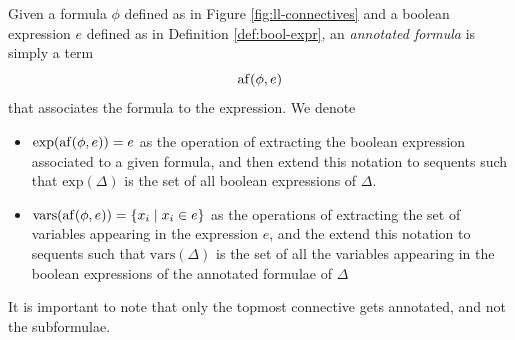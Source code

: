 \documentclass[a4paper, 12pt, english]{report}
\begin{document}
\begin{define}
	\label{def:annotated}
	Given a formula $\phi$ defined as in Figure \ref{fig:ll-connectives} and a boolean expression $e$ defined as in Definition \ref{def:bool-expr}, an \textit{annotated formula} is simply a term 
	$$ \mathrm{af}(\phi, e) $$
	that associates the formula to the expression.
	We denote 
	\begin{itemize}
		\item $ \text{exp}(\mathrm{af}(\phi, e)) = e $
			as the operation of extracting the boolean expression associated to a given formula, and then extend this notation to sequents such that $ \text{exp}(\Delta) $ is the set of all boolean expressions of $\Delta$.
		\item $\text{vars}(\mathrm{af}(\phi, e)) = \{ x_i \mid x_i \in e \} $
			as the operations of extracting the set of variables appearing in the expression $e$, and the extend this notation to sequents such that $ \text{vars}(\Delta)$ is the set of all the variables appearing in the boolean expressions of the annotated formulae of $\Delta$
	\end{itemize}
\end{define}
It is important to note that only the topmost connective gets annotated, and not the subformulae.
\end{document}
